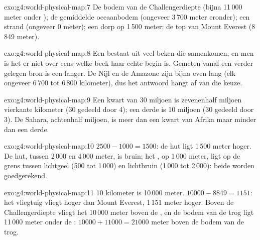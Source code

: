 \begin{solution}{exo:g4:world-physical-map:7}
De bodem van de Challengerdiepte (bijna 11\,000 meter onder ); de
gemiddelde oceaanbodem (ongeveer 3\,700 meter eronder); een strand
(ongeveer 0 meter); een dorp op 1\,500 meter; de top van Mount Everest
(8\,849 meter).
\end{solution}

\begin{solution}{exo:g4:world-physical-map:8}
Een  bestaat uit veel beken die samenkomen, en men is het er niet
over eens welke beek haar echte begin is. Gemeten vanaf een verder gelegen
bron is een  langer. De Nijl en de Amazone zijn bijna even lang (elk
ongeveer 6\,700 tot 6\,800 kilometer), dus het antwoord hangt af van die
keuze.
\end{solution}

\begin{solution}{exo:g4:world-physical-map:9}
Een kwart van 30 miljoen is zevenenhalf miljoen vierkante kilometer (30
gedeeld door 4); een derde is 10 miljoen (30 gedeeld door 3). De Sahara,
achtenhalf miljoen, is meer dan een kwart van Afrika maar minder dan een
derde.
\end{solution}

\begin{solution}{exo:g4:world-physical-map:10}
$2500 - 1000 = 1500$: de hut ligt 1\,500 meter hoger. De hut, tussen
2\,000 en 4\,000 meter, is bruin; het , op 1\,000 meter, ligt op de grens
tussen lichtgeel (500 tot 1\,000) en lichtbruin (1\,000 tot 2\,000): beide
worden goedgerekend.
\end{solution}

\begin{solution}{exo:g4:world-physical-map:11}
10 kilometer is 10\,000 meter. $10000 - 8849 = 1151$: het vliegtuig vliegt
hoger dan Mount Everest, 1\,151 meter hoger. Boven de Challengerdiepte
vliegt het 10\,000 meter boven de , en de bodem van de trog ligt
11\,000 meter onder de : $10000 + 11000 = 21000$ meter boven de bodem
van de trog.
\end{solution}
